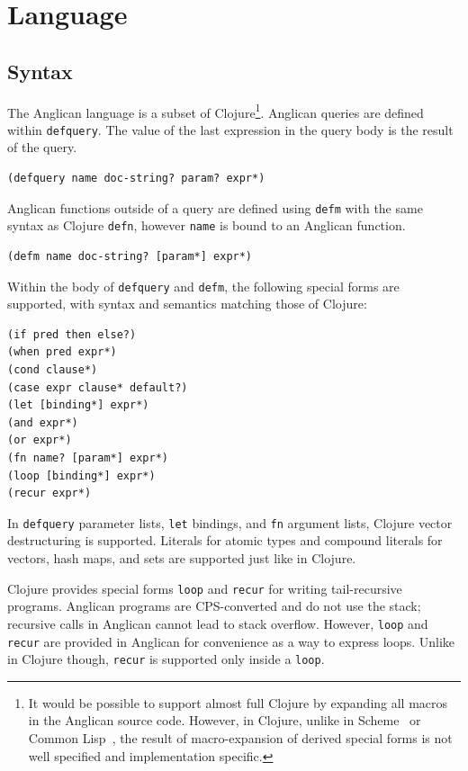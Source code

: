 \documentclass[sigconf]{acmart}
\begin{document}
\section{Language}
\label{sec:language}

\subsection{Syntax}

The Anglican language is a subset of Clojure\footnote{It would be
possible to support almost full Clojure by expanding all macros
in the Anglican source code. However, in Clojure, unlike in
Scheme~\cite{SDF+10} or Common Lisp~\cite{PC94}, the result
of macro-expansion of derived special forms is not well
specified and implementation specific.}.  Anglican queries
are defined within \texttt{defquery}. The value of the last
expression in the query body is the result of the query.
\begin{lstlisting}[style=default]
(defquery name doc-string? param? expr*)
\end{lstlisting}
Anglican functions outside of a query are defined using
\texttt{defm} with the same syntax as Clojure \texttt{defn},
however \texttt{name} is bound to an Anglican function.
\begin{lstlisting}[style=default]
(defm name doc-string? [param*] expr*)
\end{lstlisting}
Within the body of \texttt{defquery} and \texttt{defm}, the
following special forms are supported, with syntax and semantics 
matching those of Clojure:
\begin{lstlisting}[style=default]
(if pred then else?)
(when pred expr*)
(cond clause*)
(case expr clause* default?)
(let [binding*] expr*)
(and expr*)
(or expr*)
(fn name? [param*] expr*)
(loop [binding*] expr*)
(recur expr*)
\end{lstlisting}
In \texttt{defquery} parameter lists, \texttt{let} bindings, and
\texttt{fn} argument lists, Clojure vector destructuring is
supported. Literals for atomic types and compound literals for
vectors, hash maps, and sets are supported just like in Clojure.

Clojure provides special forms \texttt{loop} and \texttt{recur}
for writing tail-recursive programs.  Anglican programs are
CPS-converted and do not use the stack; recursive calls
in Anglican cannot lead to stack overflow.  However,
\texttt{loop} and \texttt{recur} are provided in Anglican for
convenience as a way to express loops. Unlike in Clojure though,
\texttt{recur} is supported only inside a \texttt{loop}.
\end{document}

